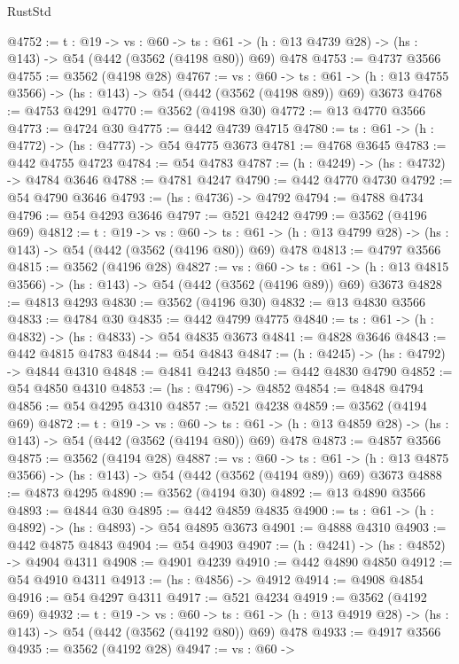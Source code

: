 \begin{lexlean}{RustStd}
\begin{coremodule}
@4752 := {t : @19} ->
  {vs : @60} ->
  {ts : @61} -> (h : @13 @4739 @28) -> (hs : @143) -> @54 (@442 (@3562 (@4198 @80)) @69) @478
@4753 := @4737 @3566
@4755 := @3562 (@4198 @28)
@4767 := {vs : @60} ->
  {ts : @61} -> (h : @13 @4755 @3566) -> (hs : @143) -> @54 (@442 (@3562 (@4198 @89)) @69) @3673
@4768 := @4753 @4291
@4770 := @3562 (@4198 @30)
@4772 := @13 @4770 @3566
@4773 := @4724 @30
@4775 := @442 @4739 @4715
@4780 := {ts : @61} -> (h : @4772) -> (hs : @4773) -> @54 @4775 @3673
@4781 := @4768 @3645
@4783 := @442 @4755 @4723
@4784 := @54 @4783
@4787 := (h : @4249) -> (hs : @4732) -> @4784 @3646
@4788 := @4781 @4247
@4790 := @442 @4770 @4730
@4792 := @54 @4790 @3646
@4793 := (hs : @4736) -> @4792
@4794 := @4788 @4734
@4796 := @54 @4293 @3646
@4797 := @521 @4242
@4799 := @3562 (@4196 @69)
@4812 := {t : @19} ->
  {vs : @60} ->
  {ts : @61} -> (h : @13 @4799 @28) -> (hs : @143) -> @54 (@442 (@3562 (@4196 @80)) @69) @478
@4813 := @4797 @3566
@4815 := @3562 (@4196 @28)
@4827 := {vs : @60} ->
  {ts : @61} -> (h : @13 @4815 @3566) -> (hs : @143) -> @54 (@442 (@3562 (@4196 @89)) @69) @3673
@4828 := @4813 @4293
@4830 := @3562 (@4196 @30)
@4832 := @13 @4830 @3566
@4833 := @4784 @30
@4835 := @442 @4799 @4775
@4840 := {ts : @61} -> (h : @4832) -> (hs : @4833) -> @54 @4835 @3673
@4841 := @4828 @3646
@4843 := @442 @4815 @4783
@4844 := @54 @4843
@4847 := (h : @4245) -> (hs : @4792) -> @4844 @4310
@4848 := @4841 @4243
@4850 := @442 @4830 @4790
@4852 := @54 @4850 @4310
@4853 := (hs : @4796) -> @4852
@4854 := @4848 @4794
@4856 := @54 @4295 @4310
@4857 := @521 @4238
@4859 := @3562 (@4194 @69)
@4872 := {t : @19} ->
  {vs : @60} ->
  {ts : @61} -> (h : @13 @4859 @28) -> (hs : @143) -> @54 (@442 (@3562 (@4194 @80)) @69) @478
@4873 := @4857 @3566
@4875 := @3562 (@4194 @28)
@4887 := {vs : @60} ->
  {ts : @61} -> (h : @13 @4875 @3566) -> (hs : @143) -> @54 (@442 (@3562 (@4194 @89)) @69) @3673
@4888 := @4873 @4295
@4890 := @3562 (@4194 @30)
@4892 := @13 @4890 @3566
@4893 := @4844 @30
@4895 := @442 @4859 @4835
@4900 := {ts : @61} -> (h : @4892) -> (hs : @4893) -> @54 @4895 @3673
@4901 := @4888 @4310
@4903 := @442 @4875 @4843
@4904 := @54 @4903
@4907 := (h : @4241) -> (hs : @4852) -> @4904 @4311
@4908 := @4901 @4239
@4910 := @442 @4890 @4850
@4912 := @54 @4910 @4311
@4913 := (hs : @4856) -> @4912
@4914 := @4908 @4854
@4916 := @54 @4297 @4311
@4917 := @521 @4234
@4919 := @3562 (@4192 @69)
@4932 := {t : @19} ->
  {vs : @60} ->
  {ts : @61} -> (h : @13 @4919 @28) -> (hs : @143) -> @54 (@442 (@3562 (@4192 @80)) @69) @478
@4933 := @4917 @3566
@4935 := @3562 (@4192 @28)
@4947 := {vs : @60} ->

\end{coremodule}
\end{lexlean}
